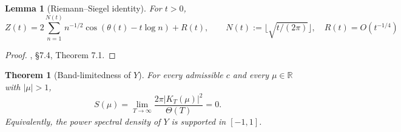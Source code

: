 \documentclass[11pt]{article}
\newtheorem{theorem}{Theorem}
\newtheorem{lemma}{Lemma}
\begin{document}
\begin{lemma}[Riemann--Siegel identity]\label{lem:RS}
For $t>0$,
\begin{equation}\label{eq:RS}
Z(t) = 2\sum_{n=1}^{N(t)}n^{-1/2}\cos(\theta(t)-t\log n) + R(t),\qquad N(t):=\lfloor\sqrt{t/(2\pi)}\rfloor,\quad R(t)=O(t^{-1/4})
\end{equation}
\end{lemma}

\begin{proof}\cite{Edwards}, \S7.4, Theorem 7.1.\end{proof}

\begin{theorem}[Band-limitedness of $Y$]\label{thm:bandlim}
For every admissible $c$ and every $\mu\in\mathbb{R}$ with $|\mu|>1$,
\begin{equation}\label{eq:PSDvanish}
S(\mu) = \lim_{T\to\infty}\frac{2\pi|K_T(\mu)|^2}{\Theta(T)} = 0.
\end{equation}
Equivalently, the power spectral density of $Y$ is supported in $[-1,1]$.
\end{theorem}
\end{document}
